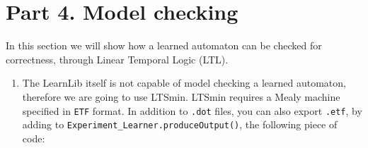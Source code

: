 \documentclass[a4paper]{article}
\begin{document}
\section*{Part 4. Model checking}
In this section we will show how a learned automaton can be checked for correctness, through Linear Temporal Logic (LTL).
\begin{enumerate}
     \item     The LearnLib itself is not capable of model checking a learned automaton, therefore we are going to use LTSmin.
               LTSmin requires a Mealy machine specified in \texttt{ETF} format. 
               In addition to \texttt{.dot} files, you can also export \texttt{.etf}, by adding to \texttt{Experiment\_Learner.produceOutput()},
               the following piece of code:
               

\end{enumerate}
\end{document}
